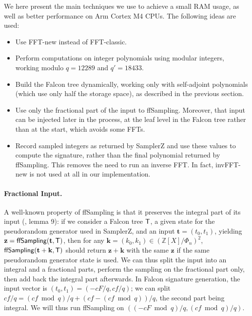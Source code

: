 \documentclass{llncs}
\newcommand{\bZ}{\mathbb{Z}}
\begin{document}
We here present the main techniques we use to achieve a small RAM usage,
as well as better performance on Arm Cortex M4 CPUs. The following ideas
are used:
\begin{itemize}

    \item Use \textsf{FFT-new} instead of \textsf{FFT-classic}.

    \item Perform computations on integer polynomials using modular
    integers, working modulo $q = 12289$ and $q' = 18433$.

    \item Build the Falcon tree dynamically, working only with
    self-adjoint polynomials (which use only half the storage space),
    as described in the previous section.

    \item Use only the fractional part of the input to \textsf{ffSampling}.
    Moreover, that input can be injected later in the process, at the
    leaf level in the Falcon tree rather than at the start, which avoids
    some FFTs.

    \item Record sampled integers as returned by \textsf{SamplerZ} and
    use these values to compute the signature, rather than the final
    polynomial returned by \textsf{ffSampling}. This removes the need to
    run an inverse FFT. In fact, \textsf{invFFT-new} is not used at all
    in our implementation.

\end{itemize}

\paragraph{Fractional Input.}
A well-known property of \textsf{ffSampling} is that it preserves the
integral part of its input (\cite{AlmFouLacPre2026}, lemma 9): if we
consider a Falcon tree $\text{\textsf{T}}$, a given state for the
pseudorandom generator used in \textsf{SamplerZ}, and an input
$\mathbf{t} = (t_0, t_1)$, yielding $\mathbf{z} =
\text{\textsf{ffSampling}}(\mathbf{t}, \text{\textsf{T}})$, then for any
$\mathbf{k} = (k_0, k_1) \in (\bZ[X]/\Phi_n)^2$,
$\text{\textsf{ffSampling}}(\mathbf{t} + \mathbf{k}, \text{\textsf{T}})$
should return $\mathbf{z} + \mathbf{k}$ with the same $\mathbf{z}$ if
the same pseudorandom generator state is used. We can thus split the
input into an integral and a fractional parts, perform the sampling on
the fractional part only, then add back the integral part afterwards.
In Falcon signature generation, the input vector is $(t_0, t_1) =
(-cF/q, cf/q)$; we can split $cf/q = (cf \bmod q)/q + (cf - (cf \bmod
q))/q$, the second part being integral. We will thus run
\textsf{ffSampling} on $((-cF \bmod q)/q, (cf \bmod q)/q)$.
\end{document}
